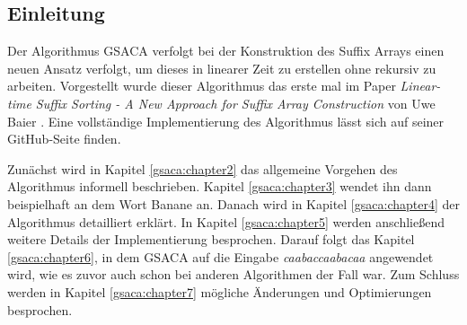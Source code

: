 \subsection{Einleitung}
\label{gsaca:chapter1}
%
Der  Algorithmus GSACA verfolgt bei der Konstruktion des Suffix Arrays einen neuen Ansatz verfolgt, um dieses in linearer Zeit zu erstellen ohne rekursiv zu arbeiten.
Vorgestellt wurde dieser Algorithmus das erste mal im Paper \textit{Linear-time Suffix Sorting - A New Approach for Suffix Array Construction} von Uwe Baier \cite{saca:3}. 
Eine vollständige Implementierung des Algorithmus lässt sich auf seiner GitHub-Seite \cite{saca:3:github} finden. \par
Zunächst wird in Kapitel \ref{gsaca:chapter2} das allgemeine Vorgehen des Algorithmus informell beschrieben. 
Kapitel \ref{gsaca:chapter3} wendet ihn dann beispielhaft an dem Wort Banane an. 
Danach wird in Kapitel \ref{gsaca:chapter4} der Algorithmus detailliert erklärt. 
In Kapitel \ref{gsaca:chapter5} werden anschließend weitere Details der Implementierung besprochen.
Darauf folgt das Kapitel \ref{gsaca:chapter6}, in dem GSACA auf die Eingabe \textit{caabaccaabacaa} angewendet wird, wie es zuvor auch schon bei anderen Algorithmen der Fall war.
Zum Schluss werden in Kapitel \ref{gsaca:chapter7} mögliche Änderungen und Optimierungen besprochen. 
